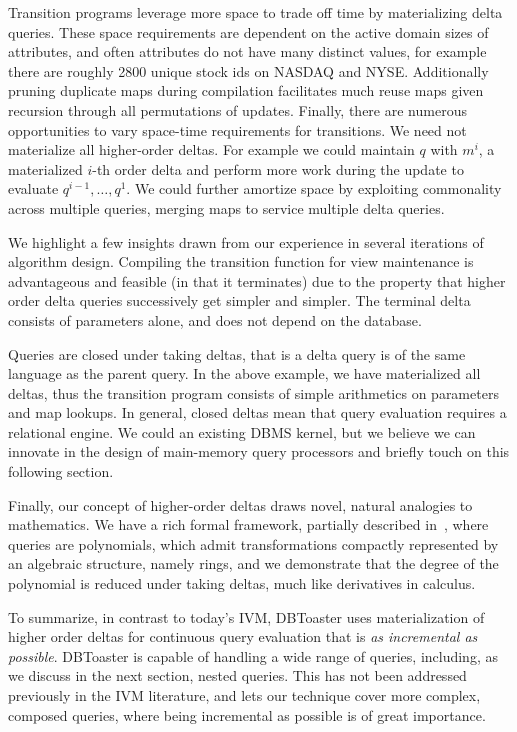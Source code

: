 Transition programs leverage more space to trade off time by materializing delta
queries. These space requirements are dependent on the active domain sizes of
attributes, and often attributes do not have many distinct values, for example
there are roughly 2800 unique stock ids on NASDAQ and NYSE. Additionally pruning
duplicate maps during compilation facilitates much reuse maps given recursion
through all permutations of updates. Finally, there are numerous opportunities
to vary space-time requirements for transitions. We need not materialize all
higher-order deltas. For example we could maintain $q$ with $m^i$, a
materialized $i$-th order delta and perform more work during the update to
evaluate $q^{i-1}, \ldots, q^1$. We could further amortize space by exploiting
commonality across multiple queries, merging maps to service multiple delta
queries.



 We highlight a few insights drawn from our experience in
several iterations of algorithm design. Compiling the transition function for
view maintenance is advantageous and feasible (in that it terminates) due to the
property that higher order delta queries successively get simpler and simpler.
The terminal delta consists of parameters alone, and does not depend on the
database.

Queries are closed under taking deltas, that is a delta query is of the same
language as the parent query. In the above example, we have materialized all
deltas, thus the transition program consists of simple arithmetics on parameters
and map lookups. In general, closed deltas mean that query evaluation requires a
relational engine. We could an existing DBMS kernel, but we believe we can
innovate in the design of main-memory query processors and briefly touch on this
following section.

Finally, our concept of higher-order deltas draws novel, natural analogies to
mathematics. We have a rich formal framework, partially described
in~\cite{koch-pods:10}, where queries are polynomials, which admit
transformations compactly represented by an algebraic structure, namely rings,
and we demonstrate that the degree of the polynomial is reduced under taking
deltas, much like derivatives in calculus.

To summarize, in contrast to today's IVM, DBToaster uses materialization of
higher order deltas for continuous query evaluation that is \textit{as
incremental as possible}. DBToaster is capable of handling a wide range of
queries, including, as we discuss in the next section, nested queries. This has
not been addressed previously in the IVM literature, and lets our technique
cover more complex, composed queries, where being incremental as possible is of
great importance.

